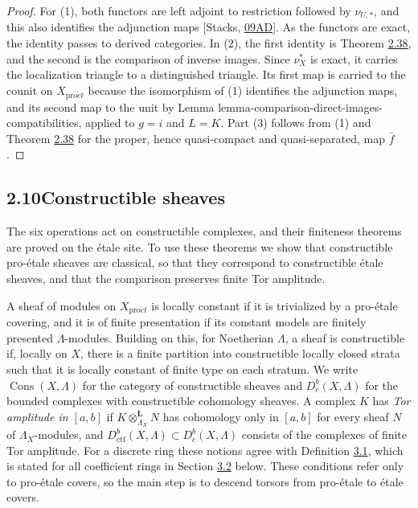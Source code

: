\documentclass[11pt]{article}
\providecommand{\Cons}{}\renewcommand{\Cons}{\operatorname{Cons}}
\providecommand{\Dbc}{}\renewcommand{\Dbc}{D^b_c}
\begin{document}
\begin{proof}[{Proof}]\label{bp120}%
For (1), both functors are left adjoint to restriction followed by \(\nu_{U,*}\), and this also identifies the adjunction maps [Stacks, \href{https://stacks.math.columbia.edu/tag/09AD}{09AD}]. As the functors are exact, the identity passes to derived categories. In (2), the first identity is Theorem \hyperref[bp113]{2.38}, and the second is the comparison of inverse images. Since \(\nu_X^*\) is exact, it carries the localization triangle to a distinguished triangle. Its first map is carried to the counit on \(X_{\mathrm{pro}\acute{e}t}\) because the isomorphism of (1) identifies the adjunction maps, and its second map to the unit by Lemma lemma-comparison-direct-images-compatibilities, applied to \(g=i\) and \(L=K\). Part (3) follows from (1) and Theorem \hyperref[bp113]{2.38} for the proper, hence quasi-compact and quasi-separated, map \(\bar f\).
\end{proof}


\subsection*{\texorpdfstring{2.10\quad Constructible sheaves}{2.10 Constructible sheaves}}
\label{bp121}%
\label{bp122}%
The six operations act on constructible complexes, and their finiteness theorems are proved on the étale site. To use these theorems we show that constructible pro-étale sheaves are classical, so that they correspond to constructible étale sheaves, and that the comparison preserves finite Tor amplitude.

A sheaf of modules on \(X_{\mathrm{pro}\acute{e}t}\) is locally constant if it is trivialized by a pro-étale covering, and it is of finite presentation if its constant models are finitely presented \(\Lambda\)-modules. Building on this, for Noetherian \(\Lambda\), a sheaf is constructible if, locally on \(X\), there is a finite partition into constructible locally closed strata such that it is locally constant of finite type on each stratum. We write \(\Cons(X,\Lambda)\) for the category of constructible sheaves and \(\Dbc(X,\Lambda)\) for the bounded complexes with constructible cohomology sheaves. A complex \(K\) has \emph{Tor amplitude in \([a,b]\)} if \(K\otimes^{\mathbf L}_{\Lambda_X}N\) has cohomology only in \([a,b]\) for every sheaf \(N\) of \(\Lambda_X\)-modules, and \(D^b_{\mathrm{ctf}}(X,\Lambda)\subset\Dbc(X,\Lambda)\) consists of the complexes of finite Tor amplitude. For a discrete ring these notions agree with Definition \hyperref[bp199]{3.1}, which is stated for all coefficient rings in Section \hyperref[bp197]{3.2} below. These conditions refer only to pro-étale covers, so the main step is to descend torsors from pro-étale to étale covers.
\end{document}
